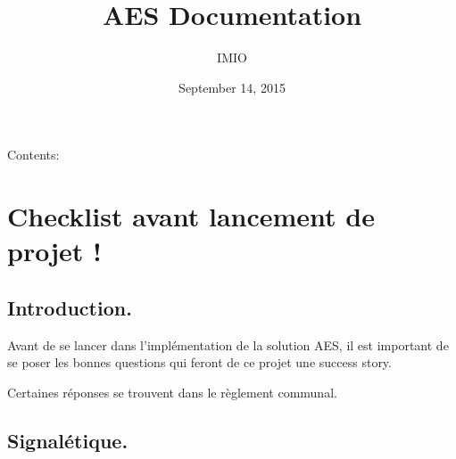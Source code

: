 \documentclass[letterpaper,10pt,english]{sphinxmanual}
\title{AES Documentation}
\date{September 14, 2015}
\author{IMIO}
\begin{document}
\maketitle
\tableofcontents
{}\label{index::doc}


Contents:


\chapter{Checklist avant lancement de projet !}
\label{checklist:welcome-to-aes-s-documentation}\label{checklist:checklist-avant-lancement-de-projet}\label{checklist::doc}

\section{Introduction.}
\label{checklist:introduction}
Avant de se lancer dans l'implémentation de la solution AES, il est important de se poser les bonnes questions qui feront de ce projet une success story.

Certaines réponses se trouvent dans le règlement communal.


\section{Signalétique.}
\label{checklist:signaletique}
\end{document}

